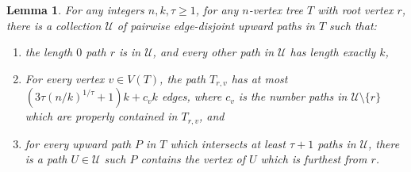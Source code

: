 \documentclass[11pt]{article}
\renewcommand{\geq}{\geqslant}
\theoremstyle{plain}
\newtheorem{lem}[thm]{Lemma}
\theoremstyle{definition}
\begin{document}
		
		\begin{lem}
			\label{lem:upwardpaths}
			For any integers $n,k,\tau\geq 1$, for any $n$-vertex tree $T$ with root vertex $r$, there is a collection $\mathcal{U}$ of pairwise edge-disjoint upward paths in $T$ such that:
			\begin{enumerate}
				\item\label{item:pathlengths} the length $0$ path $r$ is in $\mathcal{U}$, and every other path in $\mathcal{U}$ has length exactly $k$,
				\item\label{item:depth}    For every vertex $v\in V(T)$, the path $T_{r,v}$ has at most $(3\tau(n/k)^{1/\tau}+1)k +c_vk$ edges, where $c_v$ is the number paths in $\mathcal{U}\setminus \{r\}$ which are properly contained in $T_{r,v}$, and
				\item\label{item:iterations} for every upward path $P$ in $T$ which intersects at least $\tau+1$ paths in $\mathcal{U}$, there is a path $U\in \mathcal{U}$ such $P$ contains the vertex of $U$ which is furthest from $r$.    
			\end{enumerate}    
		\end{lem}
		
\end{document}
